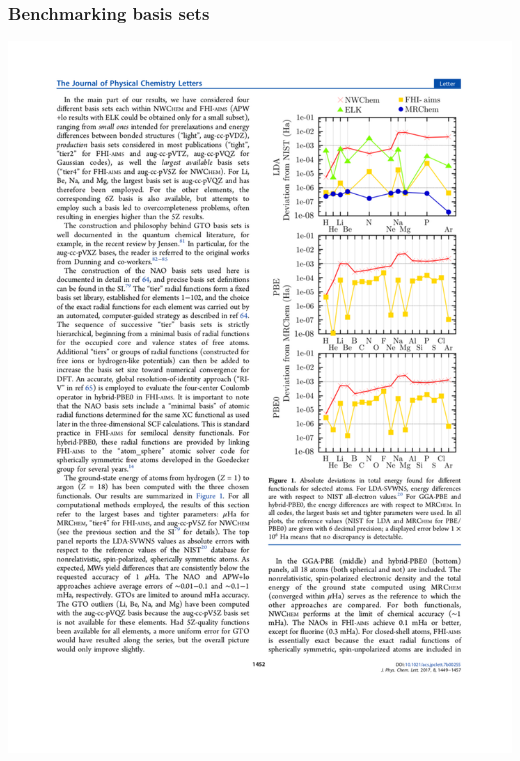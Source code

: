\begin{frame}
    \frametitle{Benchmarking basis sets}
    \begin{center}
	\includegraphics[scale=0.80, clip, viewport = 300 330 550 615]{figures/elephant_atoms.pdf}
    \end{center}
\end{frame}

